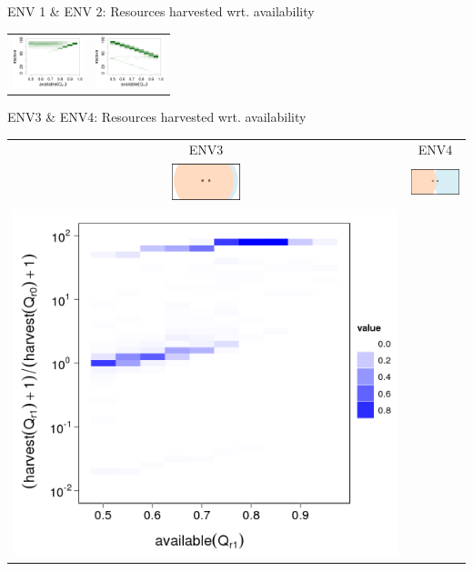\documentclass[8pt, handout=show,notes=show]{beamer}
\begin{document}
\begin{frame}{ENV 1 \& ENV 2: Resources harvested wrt. availability}
\begin{table}[H]
\begin{tabular}{cc}
\includegraphics[width=2cm]{../images/5StaticEnv/AliveHM_env1}&\includegraphics[width=2cm]{../images/5StaticEnv/AliveHM_env2}\\
		\end{tabular}
	\end{table}
\end{frame}

\begin{frame}{ENV3 \& ENV4: Resources harvested wrt. availability}
	\begin{table}[H]
		\centering
		\begin{tabular}{cc}
		ENV3 & ENV4\\
		\includegraphics[width=2cm]{../images/5StaticEnv/environments/staticEnv3}&
		\includegraphics[width=2cm]{../images/5StaticEnv/environments/staticEnv4}\\
		\includegraphics[width=\imgSize]{../images/5StaticEnv/medianRatioHM_env3}&

\end{tabular}
\end{table}
\end{frame}
\end{document}
